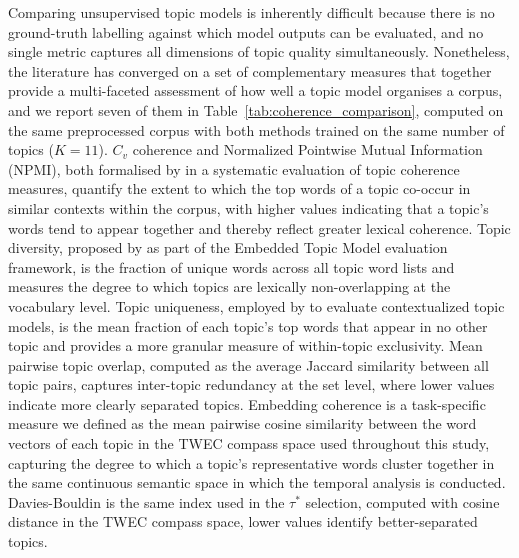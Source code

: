 Comparing unsupervised topic models is inherently difficult because there is no ground-truth labelling against which model outputs can be evaluated, and no single metric captures all dimensions of topic quality simultaneously. Nonetheless, the literature has converged on a set of complementary measures that together provide a multi-faceted assessment of how well a topic model organises a corpus, and we report seven of them in Table~\ref{tab:coherence_comparison}, computed on the same preprocessed corpus with both methods trained on the same number of topics ($K = 11$). $C_v$ coherence and Normalized Pointwise Mutual Information (NPMI), both formalised by \citet{roder_exploring_2015} in a systematic evaluation of topic coherence measures, quantify the extent to which the top words of a topic co-occur in similar contexts within the corpus, with higher values indicating that a topic's words tend to appear together and thereby reflect greater lexical coherence. Topic diversity, proposed by \citet{dieng_topic_2020} as part of the Embedded Topic Model evaluation framework, is the fraction of unique words across all topic word lists and measures the degree to which topics are lexically non-overlapping at the vocabulary level. Topic uniqueness, employed by \citet{bianchi_pretraining_2021} to evaluate contextualized topic models, is the mean fraction of each topic's top words that appear in no other topic and provides a more granular measure of within-topic exclusivity. Mean pairwise topic overlap, computed as the average Jaccard similarity between all topic pairs, captures inter-topic redundancy at the set level, where lower values indicate more clearly separated topics. Embedding coherence is a task-specific measure we defined as the mean pairwise cosine similarity between the word vectors of each topic in the TWEC compass space used throughout this study, capturing the degree to which a topic's representative words cluster together in the same continuous semantic space in which the temporal analysis is conducted. Davies-Bouldin \citep{davies1979cluster} is the same index used in the $\tau^*$ selection, computed with cosine distance in the TWEC compass space, lower values identify better-separated topics.

